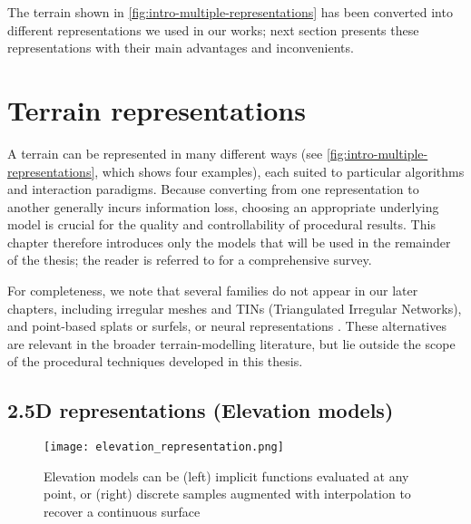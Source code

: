 The terrain shown in \cref{fig:intro-multiple-representations} has been converted into different representations we used in our works; next section presents these representations with their main advantages and inconvenients.



\section{Terrain representations}
A terrain can be represented in many different ways (see \cref{fig:intro-multiple-representations}, which shows four examples), each suited to particular algorithms and interaction paradigms. Because converting from one representation to another generally incurs information loss, choosing an appropriate underlying model is crucial for the quality and controllability of procedural results. This chapter therefore introduces only the models that will be used in the remainder of the thesis; the reader is referred to \cite{Galin2019} for a comprehensive survey.

For completeness, we note that several families do not appear in our later chapters, including irregular meshes and TINs (Triangulated Irregular Networks), and point-based splats or surfels, or neural representations \cite{Yang2005, Zhu2008, Arnone2021, Atas2022, Chen2024, Chen2025, Dai2024, Li2022}. These alternatives are relevant in the broader terrain-modelling literature, but lie outside the scope of the procedural techniques developed in this thesis.

\subsection{2.5D representations (Elevation models)}

\begin{figure}
  \texttt{[image: elevation\_representation.png]}
  \caption[Implicit and discrete elevation models]{Elevation models can be (left) implicit functions evaluated at any point, or (right) discrete samples augmented with interpolation to recover a continuous surface \cite{Galin2019}}
  \label{fig:erosion-elevation-representation}
\end{figure}

